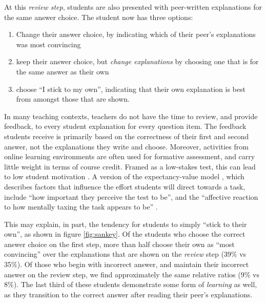 \documentclass[sigconf]{acmart}
\begin{document}
At this \textit{review step}, students are also presented with peer-written 
explanations for the same answer choice. 
The student now has three options:
\begin{enumerate}
	\item Change their answer choice, by indicating which of their peer's 
	explanations was most convincing
	\item keep their answer choice, but \textit{change explanations} by 
	choosing one that is for the same answer as their own
	\item choose ``I stick to my own'', indicating that their own explanation 
	is best from amongst those that are shown.
\end{enumerate}

In many teaching contexts, teachers do not have the time to review, and provide 
feedback, to every student explanation for every question item. 
The feedback students receive is primarily based on the correctness of their 
first and second answer, not the explanations they write and choose.
Moreover, activities from online learning environments are often used for 
formative assessment, and carry little weight in terms of course credit. 
Framed as a low-stakes test, this can lead to low student 
motivation \cite{wise_low_2005}. 
A version of the expectancy-value model \cite{pintrich_dynamic_1989}, which 
describes factors that influence the effort students will direct towards a 
task, include ``how important they perceive the test to be'', and the 
``affective reaction to how mentally taxing the task appears to be'' 
\cite{wolf_consequence_1995}.

This may explain, in part, the tendency for students to simply ``stick to their 
own'', as shown in figure \ref{fig:sankey}. 
Of the students who choose the correct answer choice on the first step, more 
than half choose their own as ``most convincing'' over the explanations that 
are shown on the \textit{review} step (39\% vs 35\%).
Of those who begin with incorrect answer, and maintain their 
incorrect answer on the review step, we find approximately the same relative 
ratios (9\% vs 8\%).
The last third of these students demonstrate some form of \textit{learning} as 
well, as they transition to the correct answer after reading their peer's 
explanations.
\end{document}
